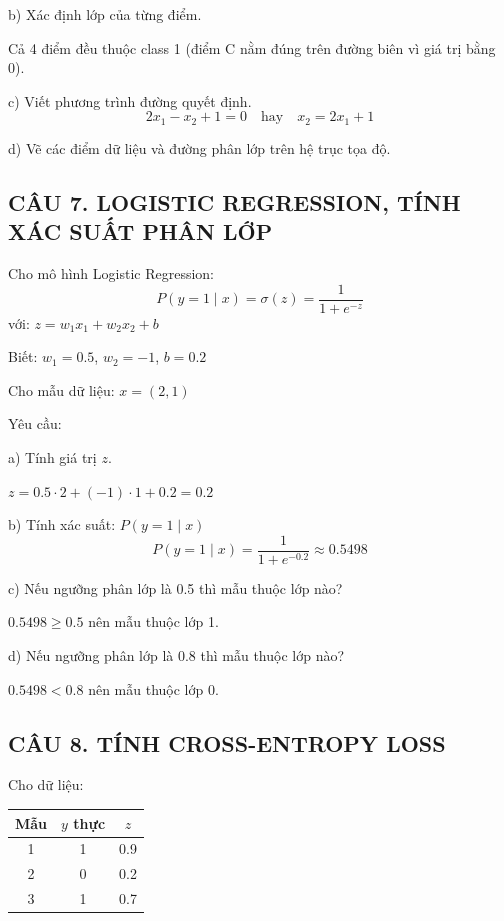 \documentclass[a4paper,12pt]{article}
\begin{document}
b) Xác định lớp của từng điểm.

Cả 4 điểm đều thuộc class 1 (điểm C nằm đúng trên đường biên vì giá trị bằng 0).

c) Viết phương trình đường quyết định.
\[ 2x_1 - x_2 + 1 = 0 \quad \text{hay} \quad x_2 = 2x_1 + 1 \]

d) Vẽ các điểm dữ liệu và đường phân lớp trên hệ trục tọa độ.
\begin{center}
\end{center}

\subsection*{CÂU 7. LOGISTIC REGRESSION, TÍNH XÁC SUẤT PHÂN LỚP}

Cho mô hình Logistic Regression:
\[ P(y = 1 \mid x) = \sigma(z) = \frac{1}{1 + e^{-z}} \]
với: $z = w_1 x_1 + w_2 x_2 + b$

Biết: $w_1 = 0.5$, $w_2 = -1$, $b = 0.2$

Cho mẫu dữ liệu: $x = (2, 1)$

Yêu cầu:

a) Tính giá trị $z$.

$z = 0.5 \cdot 2 + (-1) \cdot 1 + 0.2 = 0.2$

b) Tính xác suất: $P(y = 1 \mid x)$
\[ P(y = 1 \mid x) = \frac{1}{1 + e^{-0.2}} \approx 0.5498 \]

c) Nếu ngưỡng phân lớp là 0.5 thì mẫu thuộc lớp nào?

$0.5498 \geq 0.5$ nên mẫu thuộc lớp 1.

d) Nếu ngưỡng phân lớp là 0.8 thì mẫu thuộc lớp nào?

$0.5498 < 0.8$ nên mẫu thuộc lớp 0.

\subsection*{CÂU 8. TÍNH CROSS-ENTROPY LOSS}

Cho dữ liệu:
\begin{center}
\begin{tabular}{|c|c|c|}
\hline
Mẫu & $y$ thực & $z$ \\
\hline
1 & 1 & 0.9 \\
2 & 0 & 0.2 \\
3 & 1 & 0.7 \\
\hline
\end{tabular}
\end{center}
\end{document}

